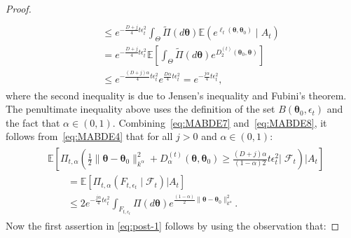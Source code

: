 \documentclass[final,12pt]{colt2026} %
\begin{document}
\begin{proof}
\begin{align}
\begin{split}
\\
&\quad \leq  {e^{ -  \frac{D+j}{4}  t\epsilon_t^2 } }  \int_{\Theta} \tilde \Pi(d\pmb \theta) \mathbb{E} \left( e^{\ell_{t}(\pmb \theta,\pmb \theta_0)}\;\Big|\;A_t \right) 
\\
&\quad =   {e^{ -  \frac{D+j}{4}  t\epsilon_t^2 } } \mathbb{E}\left[ \int_{\Theta} \tilde \Pi(d\pmb \theta) e^{ D_2^{(t)} \left( \pmb \theta_0, \pmb \theta \right)} \right]
\\
&\quad \leq   {e^{ - \frac{(D+j)\alpha }{4}  t\epsilon_t^2 } e^{ \frac{D \alpha }{4} t\epsilon_t^2 } }
=  e^{ - \frac{j\alpha}{4}  t\epsilon_t^2 },
\end{split}
\end{align}
where the second inequality is due to Jensen's inequality and Fubini's theorem. The penultimate inequality above uses the definition of the set $B\left(\pmb \theta_0,\epsilon_t \right)$ and the fact that $\alpha\in(0,1)$.
Combining~\eqref{eq:MABDE7} and~\eqref{eq:MABDE8}, it follows from~\eqref{eq:MABDE4}  that for all $j>0$ and $\alpha\in (0,1)$:
\begin{align}\label{eq:MABDE9}
\begin{split}
&\mathbb{E}\left[\Pi_{t,\alpha}\left( \frac{1}{2}\|\pmb \theta-\pmb \theta_0\|_{k^\alpha}^2 + D_{\alpha}^{(t)}(\pmb \theta,\pmb \theta_0) \geq \frac{(D+j)\alpha}{(1-\alpha)2} t\epsilon_t^2 \Big|\;\mathcal{F}_{t} \right)\Big | A_t \right]\\  
&\qquad = \mathbb{E} [\Pi_{t,\alpha}(F_{t,\epsilon_t} \mid \mathcal{F}_{t}) | A_t ]\\
&\qquad \leq 2 e^{ - \frac{j\alpha}{4}  t\epsilon_t^2 }  \int_{F_{t, \epsilon_t}} \Pi(d\pmb \theta) e^{\frac{(1-\alpha) }{2} \|\pmb \theta-\pmb \theta_0\|_{k^\alpha}^2}.
\end{split}
\end{align}
Now the first assertion in \eqref{eq:post-1} follows by using the observation that:

\end{proof}
\end{document}
